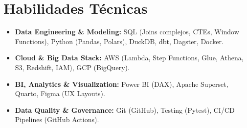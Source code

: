 \section*{Habilidades Técnicas}
\begin{itemize}
    \item \textbf{Data Engineering \& Modeling:} SQL (Joins complejos, CTEs, Window Functions), Python (Pandas, Polars), DuckDB, dbt, Dagster, Docker.
    \item \textbf{Cloud \& Big Data Stack:} AWS (Lambda, Step Functions, Glue, Athena, S3, Redshift, IAM), GCP (BigQuery).
    \item \textbf{BI, Analytics \& Visualization:} Power BI (DAX), Apache Superset, Quarto, Figma (UX Layouts).
    \item \textbf{Data Quality \& Governance:} Git (GitHub), Testing (Pytest), CI/CD Pipelines (GitHub Actions).
\end{itemize}
